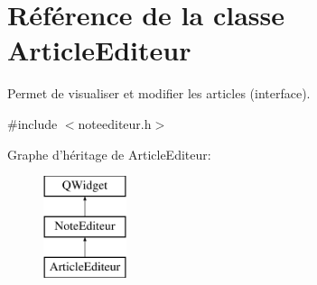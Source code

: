 \hypertarget{class_article_editeur}{\section{Référence de la classe Article\-Editeur}
\label{class_article_editeur}
}


Permet de visualiser et modifier les articles (interface).  




{\ttfamily \#include $<$noteediteur.\-h$>$}

Graphe d'héritage de Article\-Editeur\-:\begin{figure}[H]
\begin{center}
\leavevmode
\includegraphics[height=3.000000cm]{class_article_editeur}
\end{center}
\end{figure}
